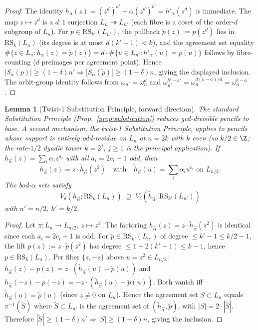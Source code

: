 \documentclass[11pt]{article}
\newtheorem{lemma}[theorem]{Lemma}
\theoremstyle{definition}
\theoremstyle{remark}
\newcommand{\RS}{\mathrm{RS}}
\begin{document}
\begin{proof}
The identity $h_\alpha(z) = (z^d)^{a'} + \alpha (z^d)^{b'} = h'_\alpha(z^d)$
is immediate. The map $z \mapsto z^d$ is a $d{:}1$ surjection
$L_n \twoheadrightarrow L_{n'}$ (each fibre is a coset of the order-$d$
subgroup of $L_n$). For $p \in \RS_{k'}(L_{n'})$, the pullback
$\tilde p(z) := p(z^d)$ lies in $\RS_k(L_n)$ (its degree is at most
$d(k'-1) < k$), and the agreement set equality
$\#\{z \in L_n : h_\alpha(z) = \tilde p(z)\} = d \cdot
\#\{u \in L_{n'} : h'_\alpha(u) = p(u)\}$ follows by fibre-counting
($d$ preimages per agreement point). Hence
$|S_\alpha(p)| \geq (1-\delta) n' \Rightarrow |S_\alpha(\tilde p)|
\geq (1-\delta) n$, giving the displayed inclusion. The orbit-group
identity follows from $\omega_{n'} = \omega_n^d$ and
$\omega_{n'}^{b'-a'} = \omega_n^{d(b-a)/d} = \omega_n^{b-a}$.
\end{proof}

\begin{lemma}[Twist-1 Substitution Principle, forward direction]
\label{lem:twist1-substitution}
The standard Substitution Principle (Prop.~\ref{prop:substitution}) reduces
gcd-divisible pencils to base. A second mechanism, the \emph{twist-1
Substitution Principle}, applies to pencils whose support is entirely
odd-residue on $L_n$ at $n = 2k$ \emph{with $k$ even} (so $k/2 \in \Z$;
the rate-$1/2$ dyadic tower $k = 2^j$, $j \geq 1$ is the principal
application). If $h_{\vec\alpha}(z) = \sum_i \alpha_i z^{a_i}$ with all
$a_i = 2c_i + 1$ odd, then
\[
 h_{\vec\alpha}(z) = z \cdot \tilde h_{\vec\alpha}(z^2) \quad\text{with}\quad
 \tilde h_{\vec\alpha}(u) = \sum_i \alpha_i u^{c_i} \text{ on } L_{n/2}.
\]
The bad-$\alpha$ sets satisfy
\[
 V_\delta(h_{\vec\alpha}; \RS_k(L_n)) \;\supseteq\; V_\delta(\tilde h_{\vec\alpha}; \RS_{k'}(L_{n'}))
\]
with $n' = n/2$, $k' = k/2$.
\end{lemma}

\begin{proof}
Let $\pi: L_n \to L_{n/2}$, $z \mapsto z^2$. The factoring
$h_{\vec\alpha}(z) = z \cdot \tilde h_{\vec\alpha}(z^2)$ is identical
since each $a_i = 2c_i + 1$ is odd. For $\tilde p \in \RS_{k'}(L_{n'})$
of degree $\leq k' - 1 \leq k/2 - 1$, the lift $p(z) := z \cdot
\tilde p(z^2)$ has degree $\leq 1 + 2(k'-1) \leq k - 1$, hence
$p \in \RS_k(L_n)$. Per fiber $\{z, -z\}$ above $u = z^2 \in L_{n/2}$:
$h_{\vec\alpha}(z) - p(z) = z \cdot (\tilde h_{\vec\alpha}(u) -
\tilde p(u))$ and $h_{\vec\alpha}(-z) - p(-z) = -z \cdot
(\tilde h_{\vec\alpha}(u) - \tilde p(u))$. Both vanish iff
$\tilde h_{\vec\alpha}(u) = \tilde p(u)$ (since $z \neq 0$ on $L_n$).
Hence the agreement set $S \subset L_n$ equals $\pi^{-1}(\tilde S)$
where $\tilde S \subset L_{n'}$ is the agreement set of
$(\tilde h_{\vec\alpha}, \tilde p)$, with $|S| = 2 \cdot |\tilde S|$.
Therefore $|\tilde S| \geq (1-\delta) n' \Rightarrow
|S| \geq (1-\delta) n$, giving the inclusion.
\end{proof}
\end{document}
